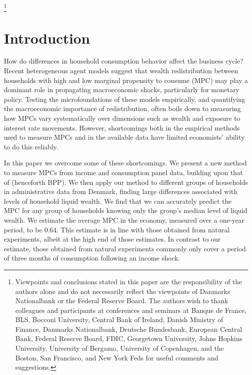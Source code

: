 \documentclass[titlepage]{\econtex}\newcommand{\texname}{ConsumptionHeterogeneity}
\begin{document}
	
	\begin{authorsinfo}
	\end{authorsinfo}
	\thanks{Viewpoints and conclusions stated in this paper are the responsibility of the authors alone and do not necessarily reflect the viewpoints of Danmarks Nationalbank or the Federal Reserve Board. The authors wish to thank colleagues and participants at conferences and seminars at Banque de France, BLS, Bocconi University, Central Bank of Ireland, Danish Ministry of Finance, Danmarks Nationalbank, Deutsche Bundesbank, European Central Bank, Federal Reserve Board, FDIC, Georgetown University, Johns Hopkins University, University of Bergamo, University of Copenhagen, and the Boston, San Francisco, and New York Feds for useful comments and suggestions.}
	
	\titlepagefinish
	\setcounter{page}{1}
	
	\pagebreak
	\section{Introduction}
	How do differences in household consumption behavior affect the business cycle? Recent heterogeneous agent models suggest that wealth redistribution between households with high and low marginal propensity to consume (MPC) may play a dominant role in propagating macroeconomic shocks, particularly for monetary policy. Testing the microfoundations of these models empirically, and quantifying the macroeconomic importance of redistribution, often boils down to measuring how MPCs vary systematically over dimensions such as wealth and exposure to interest rate movements. However, shortcomings both in the empirical methods used to measure MPCs and in the available data have limited economists' ability to do this reliably.
	
	In this paper we overcome some of these shortcomings. We present a new method to measure MPCs from income and consumption panel data, building upon that of \cite{blundell_consumption_2008} (henceforth BPP). We then apply our method to different groups of households in administrative data from Denmark, finding large differences associated with levels of household liquid wealth. We find that we can accurately predict the MPC for any group of households knowing only the group's median level of liquid wealth.  We estimate the average MPC in the economy, measured over a one-year period, to be 0.64. This estimate is in line with those obtained from natural experiments, albeit at the high end of those estimates. In contrast to our estimate, those obtained from natural experiments commonly only cover a period of three months of consumption following an income shock.
	
\end{document}
